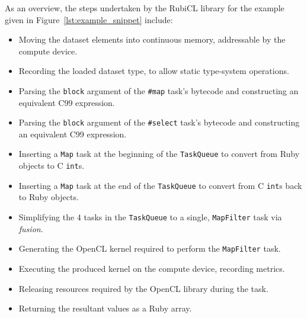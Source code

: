 As an overview, the steps undertaken by the RubiCL library for the example given in Figure~\ref{lst:example_snippet} include:
\begin{itemize}
  \item Moving the dataset elements into continuous memory, addressable by the compute device.
  \item Recording the loaded dataset type, to allow static type-system operations.
  \item Parsing the \verb|block| argument of the \verb|#map| task's bytecode and constructing an equivalent C99 expression.
  \item Parsing the \verb|block| argument of the \verb|#select| task's bytecode and constructing an equivalent C99 expression.
  \item Inserting a \verb|Map| task at the beginning of the \verb|TaskQueue| to convert from Ruby objects to C \verb|int|s.
  \item Inserting a \verb|Map| task at the end of the \verb|TaskQueue| to convert from C \verb|int|s back to Ruby objects.
  \item Simplifying the $4$ tasks in the \verb|TaskQueue| to a single, \verb|MapFilter| task via \emph{fusion}.
  \item Generating the OpenCL kernel required to perform the \verb|MapFilter| task.
  \item Executing the produced kernel on the compute device, recording metrics.
  \item Releasing resources required by the OpenCL library during the task.
  \item Returning the resultant values as a Ruby array.
\end{itemize}

